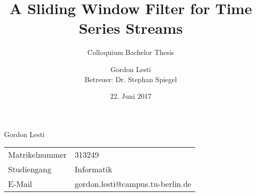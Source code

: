 \documentclass{beamer}
\begin{document}
    \graphicspath{{../img/}}
    \title{A Sliding Window Filter for Time Series Streams}
    \subtitle{Colloquium Bachelor Thesis}
    \author{Gordon Lesti\\
    {\footnotesize Betreuer: Dr. Stephan Spiegel}}
    \date{22. Juni 2017}

    \frame{\titlepage}
    \begin{frame}{Gordon Lesti}
        \begin{tabular}{ll}
            Matrikelnummer & 313249\\
            Studiengang & Informatik\\
            E-Mail & gordon.lesti@campus.tu-berlin.de
        \end{tabular}
    \end{frame}

    
    
    
    
\end{document}
